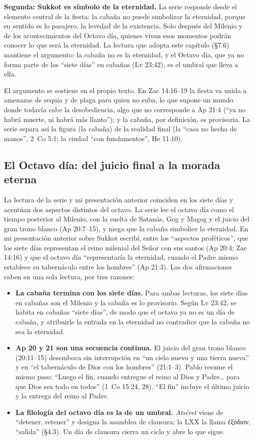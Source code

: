 \documentclass[11pt,letterpaper]{article}
\newcommand{\grc}[1]{\foreignlanguage{ancientgreek}{#1}}
\begin{document}
\textbf{Segunda: Sukkot es símbolo de la eternidad.} La serie responde desde el elemento central de la fiesta: la cabaña no puede simbolizar la eternidad, porque su sentido es lo pasajero, la levedad de la existencia. Solo después del Milenio y de los acontecimientos del Octavo día, quienes vivan esos momentos podrán conocer lo que será la eternidad. La lectura que adopta este capítulo (§7.6) mantiene el argumento: la cabaña no es la eternidad, y el Octavo día, que ya no forma parte de los ``siete días'' en cabañas (Lv 23:42), es el umbral que lleva a ella.

El argumento se sostiene en el propio texto. En Zac 14:16--19 la fiesta va unida a amenazas de sequía y de plaga para quien no suba, lo que supone un mundo donde todavía cabe la desobediencia, algo que no corresponde a Ap 21:4 (``ya no habrá muerte, ni habrá más llanto''); y la cabaña, por definición, es provisoria. La serie separa así la figura (la cabaña) de la realidad final (la ``casa no hecha de manos'', 2~Co 5:1; la ciudad ``con fundamentos'', He 11:10).

\subsection{El Octavo día: del juicio final a la morada eterna}
La lectura de la serie y mi presentación anterior coinciden en los siete días y acentúan dos aspectos distintos del octavo. La serie lee el octavo día como el tiempo posterior al Milenio, con la suelta de Satanás, Gog y Magog y el juicio del gran trono blanco (Ap 20:7--15), y niega que la cabaña simbolice la eternidad. En mi presentación anterior sobre Sukkot escribí, entre los ``aspectos proféticos'', que los siete días representan el reino milenial del Señor con sus santos (Ap 20:4; Zac 14:16) y que el octavo día ``representaría la eternidad, cuando el Padre mismo establece su tabernáculo entre los hombres'' (Ap 21:3). Las dos afirmaciones caben en una sola lectura, por tres razones:
\begin{itemize}
\item \textbf{La cabaña termina con los siete días.} Para ambas lecturas, los siete días en cabañas son el Milenio y la cabaña es lo provisorio. Según Lv 23:42, se habita en cabañas ``siete días'', de modo que el octavo ya no es un día de cabaña, y atribuirle la entrada en la eternidad no contradice que la cabaña no sea la eternidad.
\item \textbf{Ap 20 y 21 son una secuencia continua.} El juicio del gran trono blanco (20:11--15) desemboca sin interrupción en ``un cielo nuevo y una tierra nueva'' y en ``el tabernáculo de Dios con los hombres'' (21:1--3). Pablo resume el mismo paso: ``Luego el fin, cuando entregue el reino al Dios y Padre\ldots{} para que Dios sea todo en todos'' (1~Co 15:24, 28). ``El fin'' incluye el último juicio y la entrega del reino al Padre.
\item \textbf{La filología del octavo día es la de un umbral.} \emph{Atséret} viene de ``detener, retener'' y designa la asamblea de clausura; la LXX la llama \grc{ἐξόδιον}, ``salida'' (§4.3). Un día de clausura cierra un ciclo y abre lo que sigue.
\end{itemize}
\end{document}
